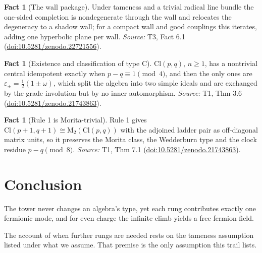 \documentclass[11pt]{article}
\theoremstyle{definition}
\newtheorem{fact}[theorem]{Fact}
\theoremstyle{plain}
\providecommand{\Cl}{}\renewcommand{\Cl}{\mathrm{Cl}}
\providecommand{\Mat}{}\renewcommand{\Mat}{\mathrm{M}}
\begin{document}
\begin{fact}[The wall package]\label{c:tower.wall-package}
Under tameness and a trivial radical line bundle the one-sided completion is nondegenerate through the wall and relocates the degeneracy to a shadow wall; for a compact wall and good couplings this iterates, adding one hyperbolic plane per wall.
\emph{Source:} T3, Fact 6.1 (\href{https://doi.org/10.5281/zenodo.22721556}{doi:10.5281/zenodo.22721556}).
\end{fact}

\begin{fact}[Existence and classification of type C]\label{c:transport.existence-classification-type-c}
$\Cl(p,q)$, $n \geq 1$, has a nontrivial central idempotent exactly when $p - q \equiv 1 \pmod 4$, and then the only ones are $\varepsilon_\pm = \tfrac12(1 \pm \omega)$, which split the algebra into two simple ideals and are exchanged by the grade involution but by no inner automorphism.
\emph{Source:} T1, Thm 3.6 (\href{https://doi.org/10.5281/zenodo.21743863}{doi:10.5281/zenodo.21743863}).
\end{fact}

\begin{fact}[Rule 1 is Morita-trivial]\label{c:transport.rule-1-morita-trivial}
Rule 1 gives $\Cl(p+1, q+1) \cong \Mat_2(\Cl(p,q))$ with the adjoined ladder pair as off-diagonal matrix units, so it preserves the Morita class, the Wedderburn type and the clock residue $p - q \pmod 8$.
\emph{Source:} T1, Thm 7.1 (\href{https://doi.org/10.5281/zenodo.21743863}{doi:10.5281/zenodo.21743863}).
\end{fact}

\section*{Conclusion}
The tower never changes an algebra's type, yet each rung contributes exactly one fermionic mode, and for even charge the infinite climb yields a free fermion field.

The account of when further rungs are needed rests on the tameness assumption listed under what we assume. That premise is the only assumption this trail lists.
\end{document}
